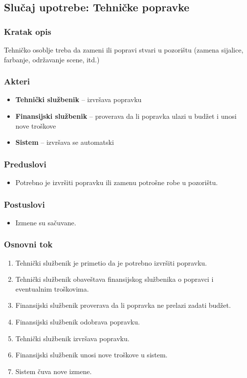 \subsection{Slučaj upotrebe: Tehničke popravke}

\subsubsection*{Kratak opis}

Tehničko osoblje treba da zameni ili popravi stvari u pozorištu (zamena sijalice, farbanje, održavanje scene, itd.)

\subsubsection*{Akteri}
\begin{itemize}
    \item \textbf{Tehnički službenik} -- izvršava popravku
    \item \textbf{Finansijski službenik} -- proverava da li popravka ulazi u budžet i unosi nove troškove
    \item \textbf{Sistem} -- izvršava se automatski
\end{itemize}

\subsubsection*{Preduslovi}
\begin{itemize}
    \item Potrebno je izvršiti popravku ili zamenu potrošne robe u pozorištu.
\end{itemize}

\subsubsection*{Postuslovi}
\begin{itemize}
    \item Izmene su sačuvane.
\end{itemize}

\subsubsection*{Osnovni tok}
\begin{enumerate}
    \item Tehnički službenik je primetio da je potrebno izvršiti popravku.
    \item Tehnički službenik obaveštava finansijskog službenika o popravci i eventualnim troškovima.
    \item Finansijski službenik proverava da li popravka ne prelazi zadati budžet.
    \item Finansijski službenik odobrava popravku.
    \item Tehnički službenik izvršava popravku.
    \item Finansijski službenik unosi nove troškove u sistem.
    \item Sistem čuva nove izmene.
\end{enumerate}

